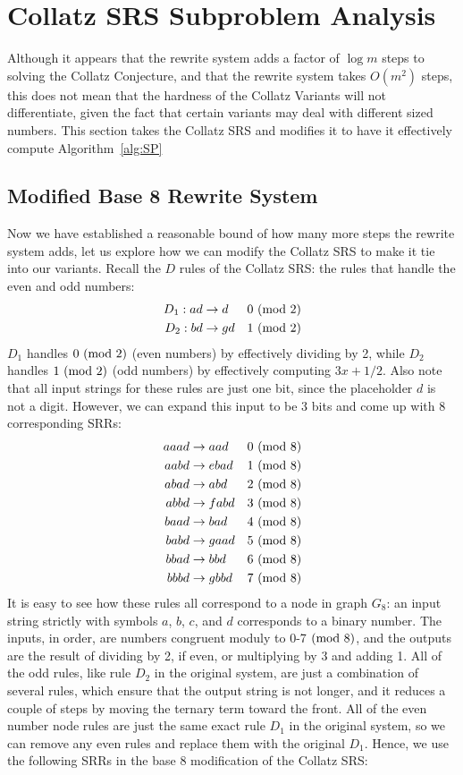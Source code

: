 \section{Collatz SRS Subproblem Analysis} \label{subsec:collatzsubproblemananalysis}
Although it appears that the rewrite system adds a factor of $\log{m}$ steps to solving the Collatz Conjecture, and that the rewrite system takes $O(m^2)$ steps, this does not mean that the hardness of the Collatz Variants will not differentiate, given the fact that certain variants may deal with different sized numbers. This section takes the Collatz SRS and modifies it to have it effectively compute Algorithm~\ref{alg:SP}
\subsection{Modified Base 8 Rewrite System} \label{subsec:base8rewrite}
Now we have established a reasonable bound of how many more steps the rewrite system adds, let us explore how we can modify the Collatz SRS to make it tie into our variants. Recall the $D$ rules of the Collatz SRS: the rules that handle the even and odd numbers:
\begin{align*}
    D_1: ad &\rightarrow d &\text{$0\ (\mathrm{mod}\ 2)$}\\
    D_2: bd &\rightarrow gd &\text{$1\ (\mathrm{mod}\ 2)$}\\
\end{align*}
$D_1$ handles $0 \ (\mathrm{mod}\ 2)$ (even numbers) by effectively dividing by 2, while $D_2$ handles $1 \ (\mathrm{mod}\ 2)$ (odd numbers)  by effectively computing $3x+1/2$. Also note that all input strings for these rules are just one bit, since the placeholder $d$ is not a digit. However, we can expand this input to be 3 bits and come up with 8 corresponding SRRs:
\begin{align*}
    aaad &\rightarrow aad &\text{$0\ (\mathrm{mod}\ 8)$}\\
    aabd &\rightarrow ebad &\text{$1\ (\mathrm{mod}\ 8)$}\\
    abad &\rightarrow abd &\text{$2\ (\mathrm{mod}\ 8)$}\\
    abbd &\rightarrow fabd &\text{$3\ (\mathrm{mod}\ 8)$}\\
    baad &\rightarrow bad &\text{$4\ (\mathrm{mod}\ 8)$}\\
    babd &\rightarrow gaad &\text{$5\ (\mathrm{mod}\ 8)$}\\
    bbad &\rightarrow bbd &\text{$6\ (\mathrm{mod}\ 8)$}\\
    bbbd &\rightarrow gbbd &\text{$7\ (\mathrm{mod}\ 8)$}
\end{align*}
It is easy to see how these rules all correspond to a node in graph $G_8$: an input string strictly with symbols $a$, $b$, $c$, and $d$ corresponds to a binary number. The inputs, in order, are numbers congruent moduly to 0-7$\ (\mathrm{mod}\ 8)$, and the outputs are the result of dividing by 2, if even, or multiplying by 3 and adding 1. All of the odd rules, like rule $D_2$ in the original system, are just a combination of several rules, which ensure that the output string is not longer, and it reduces a couple of steps by moving the ternary term toward the front. All of the even number node rules are just the same exact rule $D_1$ in the original system, so we can remove any even rules and replace them with the original $D_1$. Hence, we use the following SRRs in the base 8 modification of the Collatz SRS:
